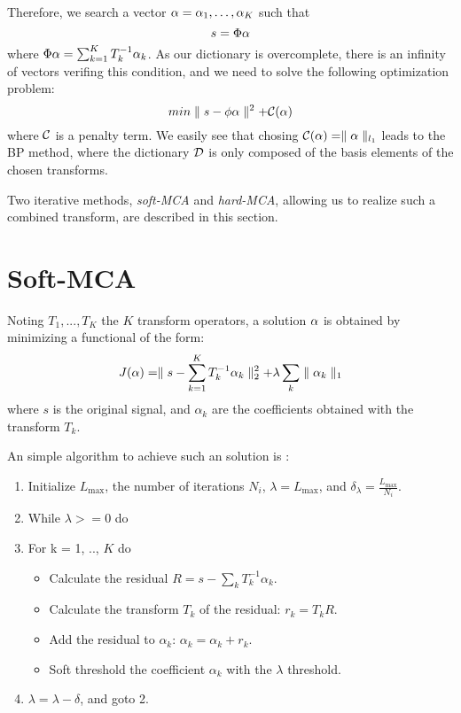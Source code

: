 Therefore, we search a vector  
${\bf \alpha} = {\alpha_1, \dots, \alpha_{K}}$ such that
\begin{equation}
s =  \Phi {\bf \alpha}
\end{equation}
where $\Phi {\bf \alpha} = \sum_{k=1}^K T_k^{-1} \alpha_k$.
As our dictionary is overcomplete, there is an infinity of vectors
verifing this condition, and we need to solve the following optimization 
problem:
\begin{equation}
min \parallel s - \phi {\bf \alpha} \parallel^2 + {\cal C}(\bf \alpha)  
\end{equation}
where ${\cal C}$ is a penalty term. We easily see that chosing
${\cal C}({\bf \alpha}) =  \parallel {\bf \alpha} \parallel_{l_1}$ leads to the
BP method, where the dictionary ${\cal D}$ is only composed of the
basis elements of the chosen transforms.
 
Two iterative methods, {\em soft-MCA} and {\em hard-MCA}, allowing us 
to realize such a combined transform, are described in this section.

\section{Soft-MCA}
\label{sect_l1}

Noting $T_1, ..., T_{K}$ the $K$ transform operators, 
a solution ${\bf \alpha}$  is obtained by minimizing a functional of the form:
\begin{eqnarray}
J({\bf \alpha}) = \parallel s - \sum_{k=1}^{K} T_k^{-1} \alpha_k  \parallel_2^2 + \lambda \sum_k \parallel \alpha_k \parallel_1
\label{eqn_min_l1}
\end{eqnarray}
where $s$ is the original signal, and $\alpha_k$ are the coefficients 
obtained with the transform $T_k$.

An simple algorithm to achieve such an solution is \cite{starck:spie01b,starck:sta02_3}:
\begin{enumerate}
\item Initialize $L_{\max}$, the number of iterations $N_i$, 
$\lambda = L_{\max}$, and $\delta_{\lambda} = \frac{L_{\max}}{N_i}$.
\item While $\lambda >= 0$ do
\item For k = 1, .., $K$ do
\begin{itemize}
\item Calculate the residual $R = s - \sum_k T_k^{-1} \alpha_k$.
\item Calculate the  transform $T_k$ of the residual:
$r_k = T_k R$.
\item Add the residual to  $\alpha_k$:  $\alpha_k = \alpha_k + r_k$.
\item Soft threshold the coefficient $\alpha_k$ with the $\lambda$ threshold.
\end{itemize}
\item $\lambda = \lambda - \delta$, and goto 2.
\end{enumerate}

